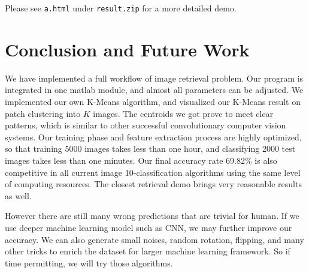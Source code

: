 \documentclass{acm_proc_article-sp}
\begin{document}
Please see \texttt{a.html} under \texttt{result.zip} for a more detailed demo.
\section{Conclusion and Future Work}
We have implemented a full workflow of image retrieval problem. Our program is
integrated in one matlab module, and almost all parameters can be adjusted. We
implemented our own K-Means algorithm, and visualized our K-Means result on
patch clustering into $K$ images. The centroids we got prove to meet clear
patterns, which is similar to other successful convolutionary computer vision
systems. Our training phase and feature extraction process are highly
optimized, so that training 5000 images takes less than one hour, and
classifying 2000 test images takes less than one minutes. Our final accuracy
rate 69.82\% is also competitive in all current image 10-classification
algorithms using the same level of computing resources. The closest retrieval
demo brings very reasonable results as well.

However there are still many wrong predictions that are trivial for human. If
we use deeper machine learning model such as CNN, we may further improve our
accuracy. We can also generate small noises, random rotation, flipping, and
many other tricks to enrich the dataset for larger machine learning framework.
So if time permitting, we will try those algorithms.

\nocite{*}

 

\balancecolumns
\end{document}
